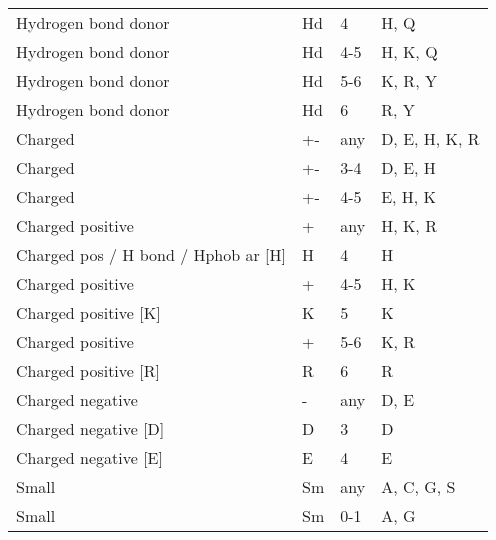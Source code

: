 \begin{table}[H]
{\begin{tabular}{llll}
                     Hydrogen bond donor &           Hd &                4 &                          H, Q \\
                     Hydrogen bond donor &           Hd &              4-5 &                       H, K, Q \\
                     Hydrogen bond donor &           Hd &              5-6 &                       K, R, Y \\
                     Hydrogen bond donor &           Hd &                6 &                          R, Y \\
                                 Charged &           +- &              any &                 D, E, H, K, R \\
                                 Charged &           +- &              3-4 &                       D, E, H \\
                                 Charged &           +- &              4-5 &                       E, H, K \\
                        Charged positive &            + &              any &                       H, K, R \\
     Charged pos / H bond / Hphob ar [H] &            H &                4 &                             H \\
                        Charged positive &            + &              4-5 &                          H, K \\
                    Charged positive [K] &            K &                5 &                             K \\
                        Charged positive &            + &              5-6 &                          K, R \\
                    Charged positive [R] &            R &                6 &                             R \\
                        Charged negative &            - &              any &                          D, E \\
                    Charged negative [D] &            D &                3 &                             D \\
                    Charged negative [E] &            E &                4 &                             E \\
                                   Small &           Sm &              any &                    A, C, G, S \\
                                   Small &           Sm &              0-1 &                          A, G \\

\end{tabular}}
\end{table}
